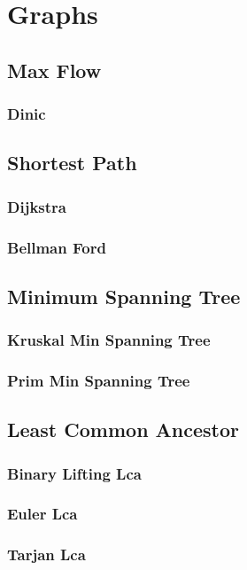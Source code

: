 \section{Graphs}
  \subsection{Max Flow}
    \subsubsection{Dinic}
  \subsection{Shortest Path}
    \subsubsection{Dijkstra}
    \subsubsection{Bellman Ford}
  \subsection{Minimum Spanning Tree}
    \subsubsection{Kruskal Min Spanning Tree}
    \subsubsection{Prim Min Spanning Tree}
  \subsection{Least Common Ancestor}
    \subsubsection{Binary Lifting Lca}
    \subsubsection{Euler Lca}
    \subsubsection{Tarjan Lca}
